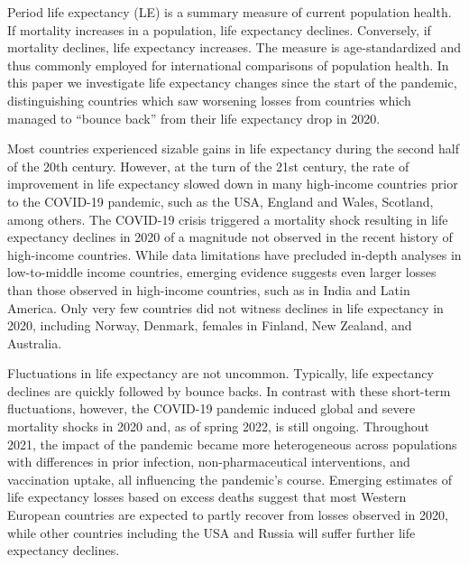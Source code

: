 \documentclass[12pt]{article}
\begin{document}
Period life expectancy (LE) is a summary measure of current population health. If mortality increases in a population, life expectancy declines. Conversely, if mortality declines, life expectancy increases. The measure is age-standardized and thus commonly employed for international comparisons of population health.  In this paper we investigate life expectancy changes since the start of the pandemic, distinguishing countries which saw worsening losses from countries which managed to ``bounce back'' from their life expectancy drop in 2020.

Most countries experienced sizable gains in life expectancy during the second half of the 20th century.\cite{Riley2005} However, at the turn of the 21st century, the rate of improvement in life expectancy slowed down in many high-income countries prior to the COVID-19 pandemic,\cite{Raleigh2019} such as the USA,\cite{Ho2018} England and Wales,\cite{Hiam2018} Scotland,\cite{Fenton2019} among others.\cite{Ho2018} The COVID-19 crisis triggered a mortality shock resulting in life expectancy declines in 2020 of a magnitude not observed in the recent history of high-income countries.\cite{Aburto2021b, Islam2021a, Andrasfay2021, Mazzuco2022} While data limitations have precluded in-depth analyses in low-to-middle income countries, emerging evidence suggests even larger losses than those observed in high-income countries, such as in India\cite{Yadav2021} and Latin America.\cite{Castro2021, GarciaGuerrero2021, Lima2021} Only very few countries did not witness declines in life expectancy in 2020, including Norway, Denmark, females in Finland, New Zealand, and Australia.\cite{Aburto2021b, Islam2021a, CanudasRomo2022, Rizzi2021a}

Fluctuations in life expectancy are not uncommon. Typically, life expectancy declines are quickly followed by bounce backs.\cite{Saha2013, Kissler2021} In contrast with these short-term fluctuations, however, the COVID-19 pandemic induced global and severe mortality shocks in 2020 and, as of spring 2022, is still ongoing. Throughout 2021, the impact of the pandemic became more heterogeneous across populations with differences in prior infection, non-pharmaceutical interventions, and vaccination uptake, all influencing the pandemic's course. Emerging estimates of life expectancy losses based on excess deaths suggest that most Western European countries are expected to partly recover from losses observed in 2020, while other countries including the USA and Russia will suffer further life expectancy declines.\cite{Heuveline2022}
\end{document}
